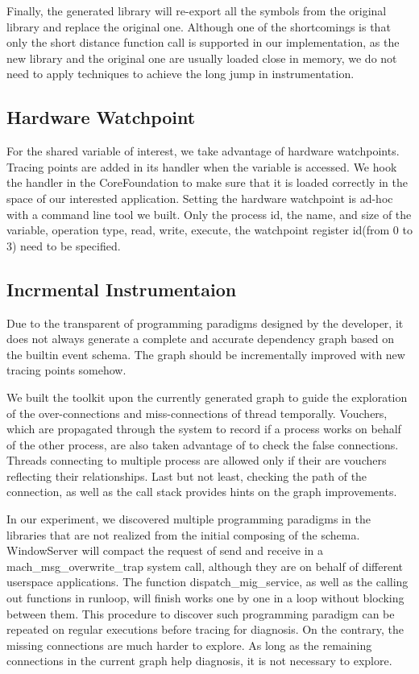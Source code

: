 Finally, the generated library will re-export all the symbols from the original library and replace the original one.
Although one of the shortcomings is that only the short distance function call is supported in our implementation, as the new library and the original one are usually loaded close in memory, we do not need to apply techniques to achieve the long jump in instrumentation.
\subsection{Hardware Watchpoint}
For the shared variable of interest, we take advantage of hardware watchpoints.
Tracing points are added in its handler when the variable is accessed.
We hook the handler in the CoreFoundation to make sure that it is loaded correctly in the space of our interested application.
Setting the hardware watchpoint is ad-hoc with a command line tool we built.
Only the process id, the name, and size of the variable, operation type, read, write, execute, the watchpoint register id(from 0 to 3) need to be specified.

\subsection{Incrmental Instrumentaion}
Due to the transparent of programming paradigms designed by the developer, it does not always generate a complete and accurate dependency graph based on the builtin event schema.
The graph should be incrementally improved with new tracing points somehow.

We built the toolkit upon the currently generated graph to guide the exploration of the over-connections and miss-connections of thread temporally.
Vouchers, which are propagated through the system to record if a process works on behalf of the other process, are also taken advantage of to check the false connections.
Threads connecting to multiple process are allowed only if their are vouchers reflecting their relationships.
Last but not least, checking the path of the connection, as well as the call stack provides hints on the graph improvements.

In our experiment, we discovered multiple programming paradigms in the libraries that are not realized from the initial composing of the schema.
WindowServer will compact the request of send and receive in a mach\_msg\_overwrite\_trap system call, although they are on behalf of different userspace applications.
The function dispatch\_mig\_service, as well as the calling out functions in runloop, will finish works one by one in a loop without blocking between them.
This procedure to discover such programming paradigm can be repeated on regular executions before tracing for diagnosis.
On the contrary, the missing connections are much harder to explore.
As long as the remaining connections in the current graph help diagnosis, it is not necessary to explore.

